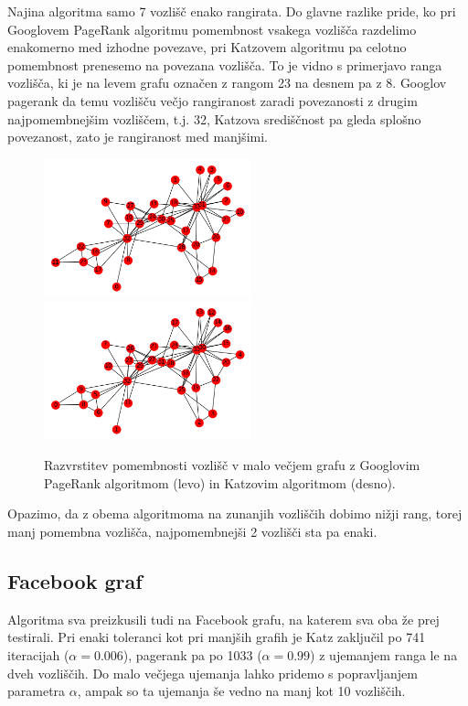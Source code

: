 \documentclass[12pt,a4paper]{amsart}
\begin{document}
Najina algoritma samo 7 vozlišč enako rangirata. Do glavne razlike pride, ko pri Googlovem PageRank algoritmu pomembnost vsakega vozlišča razdelimo enakomerno med izhodne povezave, pri Katzovem algoritmu pa celotno pomembnost prenesemo na povezana vozlišča. To je vidno s primerjavo ranga vozlišča, ki je na levem grafu označen z rangom 23 na desnem pa z 8. Googlov pagerank da temu vozlišču večjo rangiranost zaradi povezanosti z drugim najpomembnejšim vozliščem, t.j. 32, Katzova središčnost pa gleda splošno povezanost, zato je rangiranost med manjšimi. 

\begin{figure}[h]
\begin{center} 
\includegraphics[width=6cm]{O_graph1.png}
\includegraphics[width=6cm]{O_graph2.png}
\caption[Razvrstitev pomembnosti vozlišč v malo večjem grafu]{Razvrstitev pomembnosti vozlišč v malo večjem grafu z Googlovim PageRank algoritmom (levo) in Katzovim algoritmom (desno).}
\end{center}
\end{figure}

Opazimo, da z obema algoritmoma na zunanjih vozliščih dobimo nižji rang, torej manj pomembna vozlišča,  najpomembnejši 2 vozlišči sta pa enaki. 


\subsection{Facebook graf}
Algoritma sva preizkusili tudi na Facebook grafu, na katerem sva oba že prej testirali. Pri enaki toleranci kot pri manjših grafih je Katz zaključil po 741 iteracijah ($\alpha = 0.006$), pagerank pa po 1033 ($\alpha = 0.99$) z ujemanjem ranga le na dveh vozliščih. Do malo večjega ujemanja lahko pridemo s popravljanjem parametra $\alpha$, ampak so ta ujemanja še vedno na manj kot 10 vozliščih.
\end{document}
